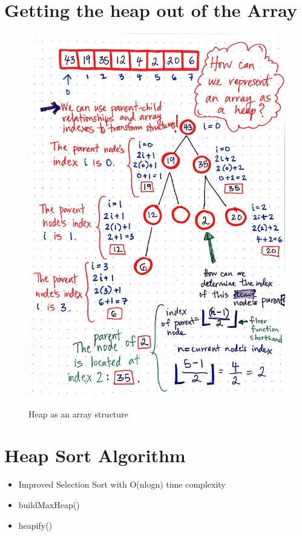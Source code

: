 	\section{Getting the heap out of the Array}
	\begin{figure}[H]
		\centering
		\scalebox{0.40}
			{\includegraphics{images/heap_2}}
		\caption{Heap as an array structure}
	\end{figure}	
	
	\section{Heap Sort Algorithm}
		\begin{itemize}
			\item Improved Selection Sort with O(nlogn) time complexity
			\item buildMaxHeap()
			\item heapify()
		\end{itemize}

